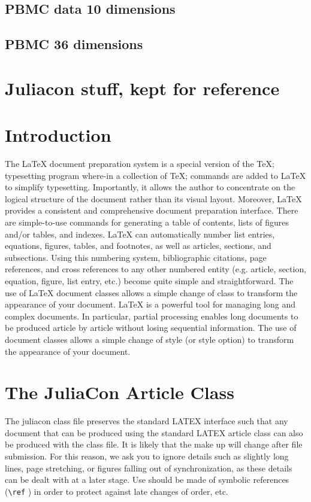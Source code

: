 \documentclass{juliacon}
\begin{document}
\subsection{PBMC data 10 dimensions}
\subsection{PBMC 36 dimensions}


\pagebreak
\section{Juliacon stuff, kept for reference}
\section{Introduction}

The \LaTeX{} document preparation system is a special version of the
\TeX; typesetting program where-in a collection of \TeX; commands
are added to \LaTeX{} to simplify typesetting. Importantly, it allows
the author to concentrate on the logical structure of the document
rather than its visual layout.\vskip 6pt
Moreover, \LaTeX{} provides a consistent and comprehensive document
preparation interface. There are simple-to-use commands for
generating a table of contents, lists of figures and/or tables, and indexes.
\LaTeX{} can automatically number list entries, equations, figures,
tables, and footnotes, as well as articles, sections, and subsections.
Using this numbering system, bibliographic citations, page
references, and cross references to any other numbered entity (e.g.
article, section, equation, figure, list entry, etc.) become quite simple
and straightforward. The use of \LaTeX{} document classes allows
a simple change of class to transform the appearance of your document.\vskip 6pt
\LaTeX{} is a powerful tool for managing long and complex documents.
In particular, partial processing enables long documents to
be produced article by article without losing sequential information.
The use of document classes allows a simple change of style
(or style option) to transform the appearance of your document.



\section{The JuliaCon Article Class}
\label{sec:documentclass}
%
The juliacon class file preserves the standard LATEX{} interface such
that any document that can be produced using the standard LATEX{}
article class can also be produced with the class file.\vskip 6pt
It is likely that the make up will change after file submission. For
this reason, we ask you to ignore details such as slightly long lines,
page stretching, or figures falling out of synchronization, as these
details can be dealt with at a later stage.\vskip 6pt
Use should be made of symbolic references (\verb|\ref| ) in order to
protect against late changes of order, etc.
\end{document}
